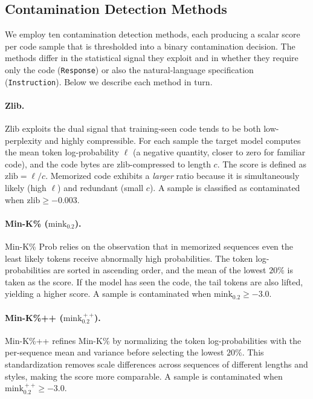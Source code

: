 \subsection{Contamination Detection Methods}
\label{sec:methods}

We employ ten contamination detection methods, each producing a scalar score per code sample that is thresholded into a binary contamination decision. The methods differ in the statistical signal they exploit and in whether they require only the code (\texttt{Response}) or also the natural-language specification (\texttt{Instruction}). Below we describe each method in turn.

\paragraph{Zlib.}
Zlib exploits the dual signal that training-seen code tends to be both low-perplexity and highly compressible. For each sample the target model computes the mean token log-probability $\ell$ (a negative quantity, closer to zero for familiar code), and the code bytes are zlib-compressed to length $c$. The score is defined as $\mathrm{zlib}=\ell/c$. Memorized code exhibits a \emph{larger} ratio because it is simultaneously likely (high $\ell$) and redundant (small $c$). A sample is classified as contaminated when $\mathrm{zlib}\ge -0.003$.

\paragraph{Min-K\% ($\mathrm{mink}_{0.2}$).}
Min-K\% Prob relies on the observation that in memorized sequences even the least likely tokens receive abnormally high probabilities. The token log-probabilities are sorted in ascending order, and the mean of the lowest $20\%$ is taken as the score. If the model has seen the code, the tail tokens are also lifted, yielding a higher score. A sample is contaminated when $\mathrm{mink}_{0.2}\ge -3.0$.

\paragraph{Min-K\%++ ($\mathrm{mink}^{\!++}_{0.2}$).}
Min-K\%++ refines Min-K\% by normalizing the token log-probabilities with the per-sequence mean and variance before selecting the lowest $20\%$. This standardization removes scale differences across sequences of different lengths and styles, making the score more comparable. A sample is contaminated when $\mathrm{mink}^{\!++}_{0.2}\ge -3.0$.

